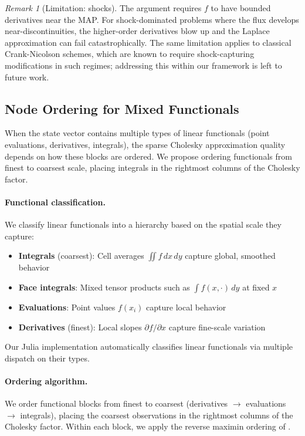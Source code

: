 \documentclass{article}
\theoremstyle{plain}
\theoremstyle{definition}
\theoremstyle{remark}
\newtheorem{remark}[theorem]{Remark}
\begin{document}
\begin{remark}[Limitation: shocks]
The argument requires $f$ to have bounded derivatives near the MAP.
For shock-dominated problems where the flux develops near-discontinuities, the higher-order derivatives blow up and the Laplace approximation can fail catastrophically.
The same limitation applies to classical Crank-Nicolson schemes, which are known to require shock-capturing modifications in such regimes; addressing this within our framework is left to future work.
\end{remark}

\subsection{Node Ordering for Mixed Functionals}
\label{app:node-ordering}

When the state vector contains multiple types of linear functionals (point evaluations, derivatives, integrals), the sparse Cholesky approximation quality depends on how these blocks are ordered.
We propose ordering functionals from finest to coarsest scale, placing integrals in the rightmost columns of the Cholesky factor.

\paragraph{Functional classification.}
We classify linear functionals into a hierarchy based on the spatial scale they capture:
\begin{itemize}[nosep]
    \item \textbf{Integrals} (coarsest): Cell averages $\iint f \, dx\,dy$ capture global, smoothed behavior
    \item \textbf{Face integrals}: Mixed tensor products such as $\int f(x, \cdot) \, dy$ at fixed $x$
    \item \textbf{Evaluations}: Point values $f(x_i)$ capture local behavior
    \item \textbf{Derivatives} (finest): Local slopes $\partial f / \partial x$ capture fine-scale variation
\end{itemize}
Our Julia implementation automatically classifies linear functionals via multiple dispatch on their types.

\paragraph{Ordering algorithm.}
We order functional blocks from finest to coarsest (derivatives $\to$ evaluations $\to$ integrals), placing the coarsest observations in the rightmost columns of the Cholesky factor.
Within each block, we apply the reverse maximin ordering of \citet{schaferSparseCholeskyFactorization2021a}.
\end{document}
